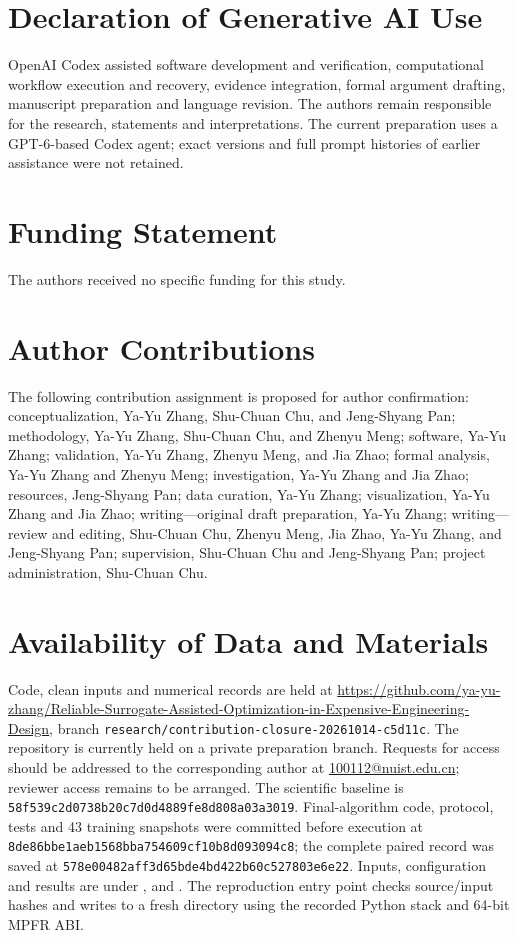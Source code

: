 \documentclass[]{interact}
\begin{document}
\section*{Declaration of Generative AI Use}

OpenAI Codex assisted software development and verification, computational workflow execution and recovery, evidence integration, formal argument drafting, manuscript preparation and language revision. The authors remain responsible for the research, statements and interpretations. The current preparation uses a GPT-6-based Codex agent; exact versions and full prompt histories of earlier assistance were not retained. 

\section*{Funding Statement}

The authors received no specific funding for this study.

\section*{Author Contributions}

The following contribution assignment is proposed for author confirmation: conceptualization, Ya-Yu Zhang, Shu-Chuan Chu, and Jeng-Shyang Pan; methodology, Ya-Yu Zhang, Shu-Chuan Chu, and Zhenyu Meng; software, Ya-Yu Zhang; validation, Ya-Yu Zhang, Zhenyu Meng, and Jia Zhao; formal analysis, Ya-Yu Zhang and Zhenyu Meng; investigation, Ya-Yu Zhang and Jia Zhao; resources, Jeng-Shyang Pan; data curation, Ya-Yu Zhang; visualization, Ya-Yu Zhang and Jia Zhao; writing---original draft preparation, Ya-Yu Zhang; writing---review and editing, Shu-Chuan Chu, Zhenyu Meng, Jia Zhao, Ya-Yu Zhang, and Jeng-Shyang Pan; supervision, Shu-Chuan Chu and Jeng-Shyang Pan; project administration, Shu-Chuan Chu.

\section*{Availability of Data and Materials}

Code, clean inputs and numerical records are held at \url{https://github.com/ya-yu-zhang/Reliable-Surrogate-Assisted-Optimization-in-Expensive-Engineering-Design}, branch \texttt{research/contribution-closure-20261014-c5d11c}. The repository is currently held on a private preparation branch. Requests for access should be addressed to the corresponding author at \href{mailto:100112@nuist.edu.cn}{100112@nuist.edu.cn}; reviewer access remains to be arranged. The scientific baseline is \texttt{58f539c2d0738b20c7d0d4889fe8d808a03a3019}. Final-algorithm code, protocol, tests and 43 training snapshots were committed before execution at \texttt{8de86bbe1aeb1568bba754609cf10b8d093094c8}; the complete paired record was saved at \texttt{578e00482aff3d65bde4bd422b60c527803e6e22}. Inputs, configuration and results are under ,  and . The reproduction entry point checks source/input hashes and writes to a fresh directory using the recorded Python stack and 64-bit MPFR ABI.
\end{document}
